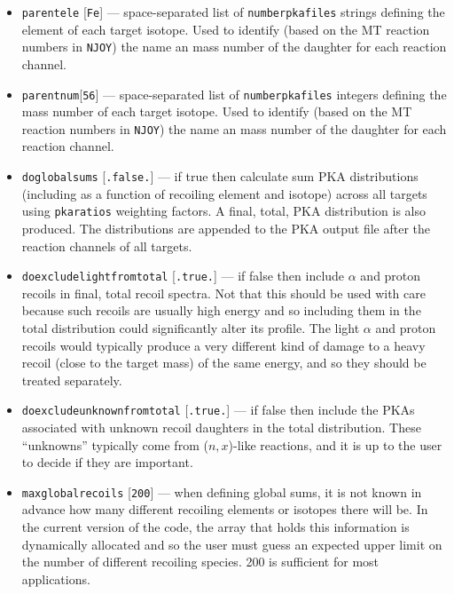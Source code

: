 \documentclass[a4paper]{article}
\begin{document}
\begin{itemize}
\item \texttt{parent{\textunderscore}ele} [\texttt{Fe}] --- space-separated list of \texttt{number{\textunderscore}pka{\textunderscore}files} strings defining the element of each target isotope. Used to identify (based on the MT reaction numbers in \texttt{NJOY}) the name an mass number of the daughter for each reaction channel.
\item \texttt{parent{\textunderscore}num}[\texttt{56}] --- space-separated list of \texttt{number{\textunderscore}pka{\textunderscore}files} integers defining the mass number of each target isotope. Used to identify (based on the MT reaction numbers in \texttt{NJOY}) the name an mass number of the daughter for each reaction channel.
\item \texttt{do{\textunderscore}global{\textunderscore}sums} [\texttt{.false.}] --- if true then calculate sum PKA distributions (including as a function of recoiling element and isotope) across all targets using \texttt{pka{\textunderscore}ratios} weighting factors. A final, total, PKA distribution is also produced. The distributions are appended to the PKA output file after the reaction channels of all targets.
\item \texttt{do{\textunderscore}exclude{\textunderscore}light{\textunderscore}from{\textunderscore}total} [\texttt{.true.}] --- if false then include \(\alpha\) and proton recoils in final, total recoil spectra. Not that this should be used with care because such recoils are usually high energy and so including them in the total distribution could significantly alter its profile. The light \(\alpha\) and proton recoils would typically produce a very different kind of damage to a heavy recoil (close to the target mass) of the same energy, and so they should be treated separately.
\item \texttt{do{\textunderscore}exclude{\textunderscore}unknown{\textunderscore}from{\textunderscore}total} [\texttt{.true.}] --- if false then include the PKAs associated with unknown recoil daughters in the total distribution. These ``unknowns'' typically come from (\(n,x\))-like reactions, and it is up to the user to decide if they are important.
\item \texttt{max{\textunderscore}global{\textunderscore}recoils} [\texttt{200}] --- when defining global sums, it is not known in advance how many different recoiling elements or isotopes there will be. In the current version of the code, the array that holds this information is dynamically allocated and so the user must guess an expected upper limit on the number of different recoiling species. 200 is sufficient for most applications.


\end{itemize}
\end{document}
